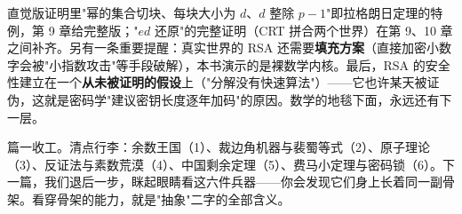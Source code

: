 \begin{chengshi}
直觉版证明里"幂的集合切块、每块大小为 $d$、$d$ 整除 $p-1$"即拉格朗日定理的特例，第 9 章给完整版；"$ed$ 还原"的完整证明（CRT 拼合两个世界）在第 9、10 章之间补齐。另有一条重要提醒：真实世界的 RSA 还需要\textbf{填充方案}（直接加密小数字会被"小指数攻击"等手段破解），本书演示的是裸数学内核。最后，RSA 的安全性建立在一个\textbf{从未被证明的假设}上（"分解没有快速算法"）——它也许某天被证伪，这就是密码学"建议密钥长度逐年加码"的原因。数学的地毯下面，永远还有下一层。
\end{chengshi}

篇一收工。清点行李：余数王国（1）、裁边角机器与裴蜀等式（2）、原子理论（3）、反证法与素数荒漠（4）、中国剩余定理（5）、费马小定理与密码锁（6）。下一篇，我们退后一步，眯起眼睛看这六件兵器——你会发现它们身上长着同一副骨架。看穿骨架的能力，就是"抽象"二字的全部含义。
